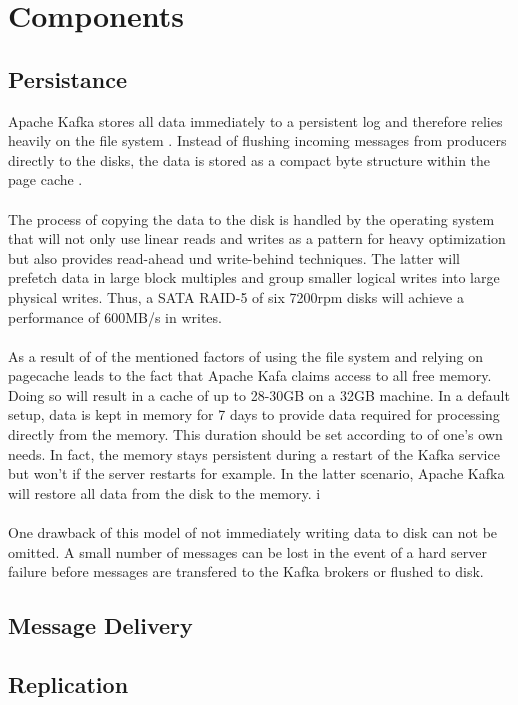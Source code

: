 \section{Components}
\subsection{Persistance}
Apache Kafka stores all data immediately to a persistent log 
and therefore relies heavily on the file system .
Instead of flushing incoming messages from producers directly to the disks, the
data is stored as a compact byte structure within the page cache .
\\ \\
The process of copying the data to the disk is handled by the operating system
that will not only use linear reads and writes  as a pattern for heavy
optimization but also provides read-ahead und write-behind techniques.
The latter will prefetch data in large block multiples and group smaller logical
writes into large physical writes. Thus, a SATA RAID-5  of six 7200rpm
disks will achieve a performance of 600MB/s in writes.
\\ \\
As a result of of the mentioned factors of using the file system and relying on
pagecache leads to the fact that Apache Kafa claims access to all free memory.
Doing so will result in a cache of up to 28-30GB on a 32GB machine. In a default
setup, data is kept in memory for 7 days to provide data required for processing
directly from the memory. This duration should be set according to of one's own
needs. In fact, the memory stays persistent during a restart of the Kafka
service but won't if the server restarts for example. In the latter scenario,
Apache Kafka will restore all data from the disk to the memory. i
\\ \\
One drawback of this model of not immediately writing data to disk can not be
omitted. A small number of messages can be lost in the event of a hard server
failure before messages are transfered to the Kafka brokers or flushed to disk. 

\subsection{Message Delivery}

\subsection{Replication}

